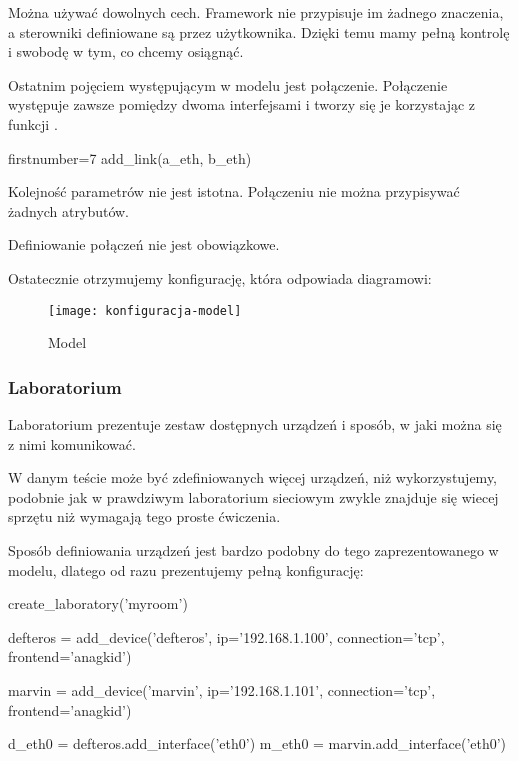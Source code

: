 \documentclass[00-praca-magisterska.tex]{subfiles}
\begin{document}
Można używać dowolnych cech. Framework nie przypisuje im żadnego znaczenia, a
sterowniki definiowane są przez użytkownika. Dzięki temu mamy pełną kontrolę i
swobodę w tym, co chcemy osiągnąć.

Ostatnim pojęciem występującym w modelu jest połączenie. Połączenie występuje
zawsze pomiędzy dwoma interfejsami i tworzy się je korzystając z funkcji
.

\begin{pythoncode*}{firstnumber=7}
  add_link(a_eth, b_eth)
\end{pythoncode*}

Kolejność parametrów nie jest istotna. Połączeniu nie można przypisywać
żadnych atrybutów.


Definiowanie połączeń nie jest obowiązkowe.

Ostatecznie otrzymujemy konfigurację, która odpowiada diagramowi:

\begin{figure}[htb]
\begin{center}
\leavevmode
\texttt{[image: konfiguracja-model]}
\end{center}
\caption{Model}
\label{fig:konfiguracja-model}
\end{figure}

\subsubsection{Laboratorium}

Laboratorium prezentuje zestaw dostępnych urządzeń i sposób, w jaki można się
z nimi komunikować.

W danym teście może być zdefiniowanych więcej urządzeń, niż wykorzystujemy, podobnie
jak w prawdziwym laboratorium sieciowym zwykle znajduje się wiecej sprzętu niż
wymagają tego proste ćwiczenia.

Sposób definiowania urządzeń jest bardzo podobny do tego zaprezentowanego w
modelu, dlatego od razu prezentujemy pełną konfigurację:

\begin{pythoncode}
  create_laboratory('myroom')

  defteros = add_device('defteros',
      ip='192.168.1.100',
      connection='tcp',
      frontend='anagkid')

  marvin = add_device('marvin',
      ip='192.168.1.101',
      connection='tcp',
      frontend='anagkid')

  d_eth0 = defteros.add_interface('eth0')
  m_eth0 = marvin.add_interface('eth0')
\end{pythoncode}
\end{document}
